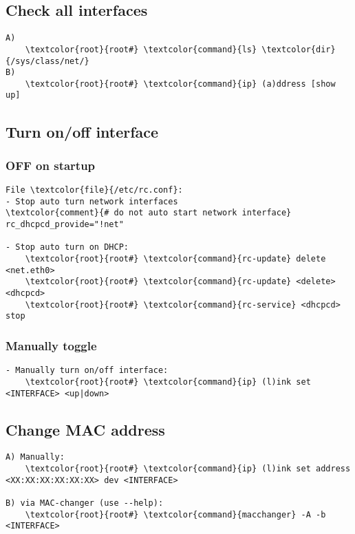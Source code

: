 \documentclass[10pt, a4paper, onecolumn, openany]{book}         %
\begin{document}
\subsection{Check all interfaces}
\begin{Verbatim}[commandchars=\\\{\}]
A)  
    \textcolor{root}{root#} \textcolor{command}{ls} \textcolor{dir}{/sys/class/net/}
B)
    \textcolor{root}{root#} \textcolor{command}{ip} (a)ddress [show up]
\end{Verbatim}

\subsection{Turn on/off interface}
\subsubsection{OFF on startup}
\begin{Verbatim}[commandchars=\\\{\}]
File \textcolor{file}{/etc/rc.conf}:
- Stop auto turn network interfaces
\textcolor{comment}{# do not auto start network interface}
rc_dhcpcd_provide="!net"

- Stop auto turn on DHCP:
    \textcolor{root}{root#} \textcolor{command}{rc-update} delete <net.eth0>
    \textcolor{root}{root#} \textcolor{command}{rc-update} <delete> <dhcpcd>
    \textcolor{root}{root#} \textcolor{command}{rc-service} <dhcpcd> stop
\end{Verbatim}

\subsubsection{Manually toggle}
\begin{Verbatim}[commandchars=\\\{\}]
- Manually turn on/off interface:
    \textcolor{root}{root#} \textcolor{command}{ip} (l)ink set <INTERFACE> <up|down>
\end{Verbatim}

\subsection{Change MAC address}
\begin{Verbatim}[commandchars=\\\{\}]
A) Manually:
    \textcolor{root}{root#} \textcolor{command}{ip} (l)ink set address <XX:XX:XX:XX:XX:XX> dev <INTERFACE>
    
B) via MAC-changer (use --help):
    \textcolor{root}{root#} \textcolor{command}{macchanger} -A -b <INTERFACE>
\end{Verbatim}
\end{document}
